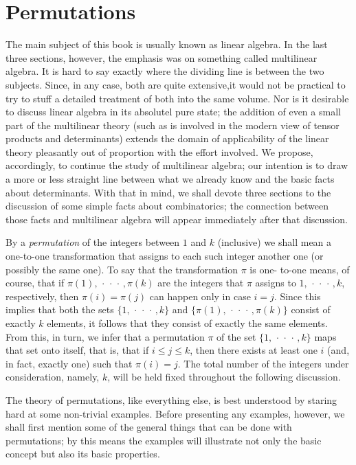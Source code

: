 \section{Permutations}

The main subject of this book is usually known as linear algebra. In the last
three sections, however, the emphasis was on something called multilinear
algebra. It is hard to say exactly where the dividing line is between the two
subjects. Since, in any case, both are quite extensive,it would not be practical
to try to stuff a detailed treatment of both into the same volume. Nor is it
desirable to discuss linear algebra in its absolutel pure state; the addition of
even a small part of the multilinear theory (such as is involved in the modern
view of tensor products and determinants) extends the domain of applicability of
the linear theory pleasantly out of proportion with the effort involved. We
propose, accordingly, to continue the study of multilinear algebra; our
intention is to draw a more or less straight line between what we already know
and the basic facts about determinants. With that in mind, we shall devote three
sections to the discussion of some simple facts about combinatorics; the
connection between those facts and multilinear algebra will appear immediately
after that discussion.

By a \emph{permutation} of the integers between \(1\) and \(k\) (inclusive) we
shall mean a one-to-one transformation that assigns to each such integer another
one (or possibly the same one). To say that the transformation \(\pi\) is one-
to-one means, of course, that if \(\pi(1), \,\cdot\,\cdot\,\cdot\,, \pi(k)\) are
the integers that \(\pi\) assigns to \(1, \,\cdot\,\cdot\,\cdot\,, k\),
respectively, then \(\pi(i) = \pi(j)\) can happen only in case \(i = j\). Since
this implies that both the sets \(\{1, \,\cdot\,\cdot\,\cdot\,, k\}\) and
\(\{\pi(1), \,\cdot\,\cdot\,\cdot\,, \pi(k)\}\) consist of exactly \(k\)
elements, it follows that they consist of exactly the same elements. From this,
in turn, we infer that a permutation \(\pi\) of the set \(\{1,
\,\cdot\,\cdot\,\cdot\,, k\}\) maps that set onto itself, that is, that if \(i
\leq j \leq k\), then there exists at least one \(i\) (and, in fact, exactly
one) such that \(\pi(i) = j\). The total number of the integers under
consideration, namely, \(k\), will be held fixed throughout the following
discussion.

The theory of permutations, like everything else, is best understood by staring
hard at some non-trivial examples. Before presenting any examples, however, we
shall first mention some of the general things that can be done with
permutations; by this means the examples will illustrate not only the basic
concept but also its basic properties.

